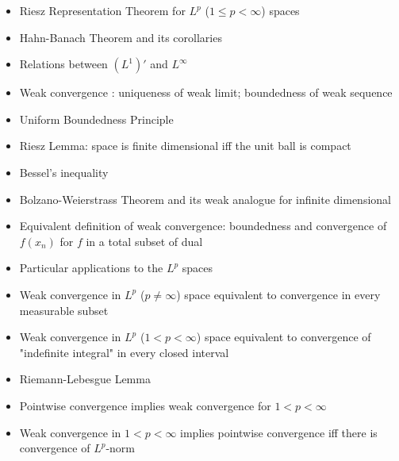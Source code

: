 \documentclass[12pt]{article}
\begin{document}
\begin{itemize}
    \item Riesz Representation Theorem for $L^p$ ($1\leq p<\infty$) spaces
    \item Hahn-Banach Theorem and its corollaries
    \item Relations between $(L^1)'$ and $L^\infty$
    \item Weak convergence : uniqueness of weak limit; boundedness of weak sequence
    \item Uniform Boundedness Principle
    \item Riesz Lemma: space is finite dimensional iff the unit ball is compact
    \item Bessel's inequality
    \item Bolzano-Weierstrass Theorem and its weak analogue for infinite dimensional
    \item Equivalent definition of weak convergence: boundedness and convergence of $f(x_n)$ for $f$ in a total subset of dual
    \item Particular applications to the $L^p$ spaces
    \item Weak convergence in $L^p$ ($p\neq\infty$) space equivalent to convergence in every measurable subset
    \item Weak convergence in $L^p$ ($1<p<\infty$) space equivalent to convergence of "indefinite integral" in every closed interval
    \item Riemann-Lebesgue Lemma
    \item Pointwise convergence implies weak convergence for $1<p<\infty$
    \item Weak convergence in $1<p<\infty$ implies pointwise convergence iff there is convergence of $L^p$-norm
\end{itemize}
\end{document}
